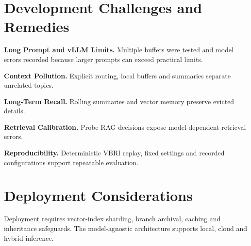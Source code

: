 \section{Development Challenges and Remedies}
\textbf{Long Prompt and vLLM Limits.} Multiple buffers were tested and model errors recorded because larger prompts can exceed practical limits.

\textbf{Context Pollution.} Explicit routing, local buffers and summaries separate unrelated topics.

\textbf{Long-Term Recall.} Rolling summaries and vector memory preserve evicted details.

\textbf{Retrieval Calibration.} Probe RAG decisions expose model-dependent retrieval errors.

\textbf{Reproducibility.} Deterministic VBRI replay, fixed settings and recorded configurations support repeatable evaluation.

\section{Deployment Considerations}\label{subsec:deployment_thesis}
Deployment requires vector-index sharding, branch archival, caching and inheritance safeguards. The model-agnostic architecture supports local, cloud and hybrid inference.
